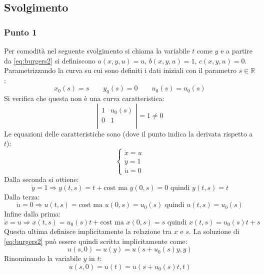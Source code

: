 \documentclass[]{scrartcl}
\begin{document}
\subsection*{Svolgimento} 
\subsubsection*{Punto 1}
Per comodità nel seguente svolgimento si chiama la variabile $ t $ come $ y $ e a partire da \eqref{eq:burgers2} si definiscono $ a(x,y,u) = u,\, b(x,y,u) = 1,\,c(x,y,u)= 0 $.
Parametrizzando la curva su cui sono definiti i dati iniziali con il parametro $ s \in \mathbb{R} $:
\[ x_0(s) = s \qquad y_0(s) = 0 \qquad u_0(s) = u_0(s)	\]
Si verifica che questa non è una curva caratteristica:
\[ \left|
\begin{array}{ccc}
1 & u_0(s) \\
0 & 1 \\
\end{array} \right| = 1 \not= 0 \]
Le equazioni delle caratteristiche sono (dove il punto indica la derivata rispetto a $ t $):
\[
\begin{cases}
\dot{x} = u  \\
\dot{y} = 1  \\
\dot{u} = 0 
\end{cases}
\]
Dalla seconda si ottiene:
\[	\dot{y} = 1 \Rightarrow y(t,s) = t + \mathrm{cost} \text{ ma } y(0,s) = 0 \text{ quindi } y(t,s) = t	\]
Dalla terza:
\[	\dot{u} = 0 \Rightarrow u(t,s) = \mathrm{cost} \text{ ma } u(0,s) = u_0(s)	\text{ quindi } u(t,s) = u_0(s)	\]
Infine dalla prima:
\[	\dot{x} = u \Rightarrow x(t,s) = u_0(s)t + \mathrm{cost} \text{ ma } x(0,s) = s \text{ quindi } x(t,s) = u_0(s)t + s	\]
Questa ultima definisce implicitamente la relazione tra $ x $ e $ s $. La soluzione di \eqref{eq:burgers2} può essere quindi scritta implicitamente come:
\[	u(s,0) = u(y) = u(s + u_0(s)y, y)		\]
Rinominando la variabile $ y $ in $ t $:
\[	u(s,0) = u(t) = u(s + u_0(s)t, t)		\]
\end{document}

